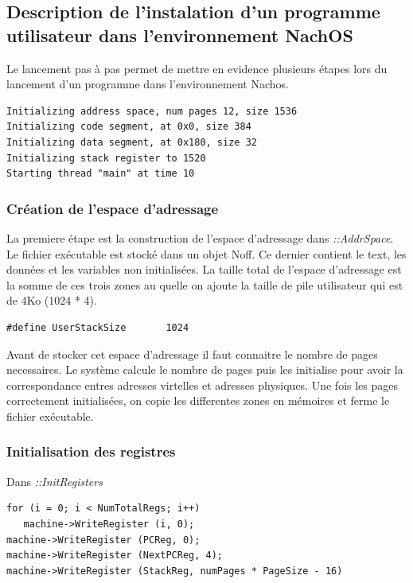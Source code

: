 \documentclass[a4paper,10pt]{article}
\begin{document}
\subsection{Description de l'instalation d'un programme utilisateur dans
l'environnement NachOS}

Le lancement pas à pas permet de mettre en evidence plusieurs étapes lors du
lancement d'un programme dans l'environnement Nachos.

\begin{lstlisting}
Initializing address space, num pages 12, size 1536
Initializing code segment, at 0x0, size 384
Initializing data segment, at 0x180, size 32
Initializing stack register to 1520
Starting thread "main" at time 10
\end{lstlisting}

\subsubsection{Création de l'espace d'adressage}

La premiere étape est la construction de l'espace d'adressage dans
\textit{::AddrSpace}. Le fichier exécutable est stocké dans un objet Noff. Ce
dernier contient le text, les données et les variables non initialisées. La
taille total de l'espace d'adressage est la somme de ces trois zones au quelle
on ajoute la taille de pile utilisateur qui est de 4Ko (1024 * 4).

\begin{lstlisting}
#define UserStackSize		1024
\end{lstlisting}

Avant de stocker cet espace d'adressage il faut connaitre le nombre de pages
necessaires. Le système calcule le nombre de pages puis les initialise pour
avoir la correspondance entres adresses virtelles et adresses physiques. Une
fois les pages correctement initialisées, on copie les differentes zones en
mémoires et ferme le fichier exécutable.

\subsubsection{Initialisation des registres}

Dans \textit{::InitRegisters} 
\begin{lstlisting}
for (i = 0; i < NumTotalRegs; i++)
   machine->WriteRegister (i, 0);
machine->WriteRegister (PCReg, 0);
machine->WriteRegister (NextPCReg, 4);
machine->WriteRegister (StackReg, numPages * PageSize - 16)
\end{lstlisting}
\end{document}
